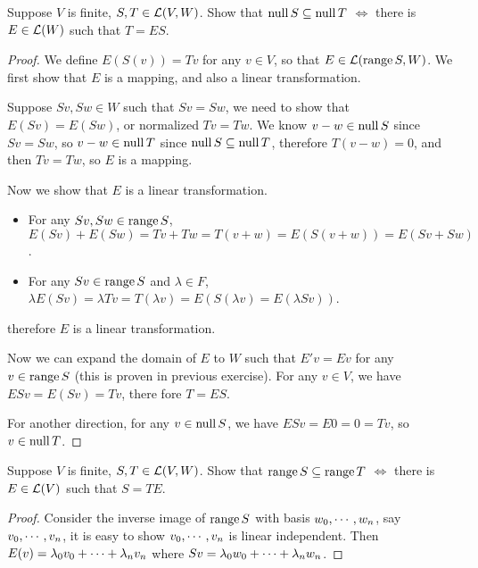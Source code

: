 \documentclass[../main.tex]{subfiles}
\begin{document}
\setcounter{exercise}{24}
\begin{exercise}
  Suppose $V$ is finite, $S, T \in \LT(V, W)$. Show that 
  $\nullv S \subseteq \nullv T$ $\iff$ there is $E \in \LT(W)$ such that $T = ES$.
\end{exercise}
\begin{proof}
  We define $E(S(v)) = Tv$ for any $v \in V$, so that $E \in \LT(\rangev S, W)$.
  We first show that $E$ is a mapping, and also a linear transformation.

  Suppose $Sv, Sw \in W$ such that $Sv = Sw$, we need to show that $E(Sv) = E(Sw)$,
  or normalized $Tv = Tw$.
  We know $v - w \in \nullv S$ since $Sv = Sw$, so $v - w \in \nullv T$
  since $\nullv S \subseteq \nullv T$, therefore $T(v - w) = 0$, and then $Tv = Tw$, so $E$ is a mapping.

  Now we show that $E$ is a linear transformation.
  \begin{itemize}
    \item For any $Sv, Sw \in \rangev S$, $E(Sv) + E(Sw) = Tv + Tw = T(v + w) = E(S(v + w)) = E(Sv + Sw)$.
    \item For any $Sv \in \rangev S$ and $\lambda \in F$, $\lambda E(Sv) = \lambda Tv = T(\lambda v) = E(S(\lambda v) = E(\lambda Sv))$.
  \end{itemize}
  therefore $E$ is a linear transformation.

  Now we can expand the domain of $E$ to $W$ such that $E'v = Ev$ for any $v \in \rangev S$
  (this is proven in previous exercise). For any $v \in V$, we have $ESv = E(Sv) = Tv$,
  there fore $T = ES$.

  For another direction, for any $v \in \nullv S$, we have $ESv = E0 = 0 = Tv$, so $v \in \nullv T$.
\end{proof}

\begin{exercise}
  Suppose $V$ is finite, $S, T \in \LT(V, W)$. Show that
  $\rangev S \subseteq \rangev T$ $\iff$ there is $E \in \LT(V)$ such that $S = TE$.
\end{exercise}
\begin{proof}
  Consider the inverse image of $\rangev S$ with basis $\join{w}{n}$,
  say $\join{v}{n}$,
  it is easy to show $\join{v}{n}$ is linear independent.
  Then $E(v) = \joinp[+]{\lambda}{v}{n}$ where $Sv = \joinp[+]{\lambda}{w}{n}$.
\end{proof}
\end{document}

